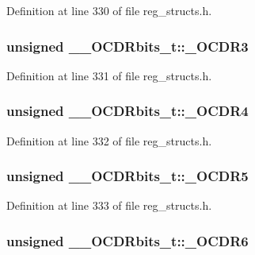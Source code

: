 Definition at line 330 of file reg\+\_\+structs.\+h.

\hypertarget{union_____o_c_d_rbits__t_a07789d2d37027e228a0e327c26fa47d9}{
\subsubsection[{\+\_\+\+O\+C\+D\+R3}]{\setlength{\rightskip}{0pt plus 5cm}unsigned \+\_\+\+\_\+\+O\+C\+D\+Rbits\+\_\+t\+::\+\_\+\+O\+C\+D\+R3}}\label{union_____o_c_d_rbits__t_a07789d2d37027e228a0e327c26fa47d9}


Definition at line 331 of file reg\+\_\+structs.\+h.

\hypertarget{union_____o_c_d_rbits__t_ad5c0c0d822f1ff81cbdead888653269d}{
\subsubsection[{\+\_\+\+O\+C\+D\+R4}]{\setlength{\rightskip}{0pt plus 5cm}unsigned \+\_\+\+\_\+\+O\+C\+D\+Rbits\+\_\+t\+::\+\_\+\+O\+C\+D\+R4}}\label{union_____o_c_d_rbits__t_ad5c0c0d822f1ff81cbdead888653269d}


Definition at line 332 of file reg\+\_\+structs.\+h.

\hypertarget{union_____o_c_d_rbits__t_acdb9350b4ea420fda0707bb3060a4e5d}{
\subsubsection[{\+\_\+\+O\+C\+D\+R5}]{\setlength{\rightskip}{0pt plus 5cm}unsigned \+\_\+\+\_\+\+O\+C\+D\+Rbits\+\_\+t\+::\+\_\+\+O\+C\+D\+R5}}\label{union_____o_c_d_rbits__t_acdb9350b4ea420fda0707bb3060a4e5d}


Definition at line 333 of file reg\+\_\+structs.\+h.

\hypertarget{union_____o_c_d_rbits__t_a97448a6b5afb44abe78e8fd8d40a17b1}{
\subsubsection[{\+\_\+\+O\+C\+D\+R6}]{\setlength{\rightskip}{0pt plus 5cm}unsigned \+\_\+\+\_\+\+O\+C\+D\+Rbits\+\_\+t\+::\+\_\+\+O\+C\+D\+R6}}\label{union_____o_c_d_rbits__t_a97448a6b5afb44abe78e8fd8d40a17b1}


